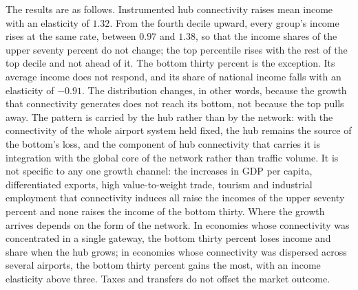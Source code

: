 The results are as follows. Instrumented hub connectivity raises mean income with an elasticity of $1.32$. From the fourth decile upward, every group's income rises at the same rate, between $0.97$ and $1.38$, so that the income shares of the upper seventy percent do not change; the top percentile rises with the rest of the top decile and not ahead of it. The bottom thirty percent is the exception. Its average income does not respond, and its share of national income falls with an elasticity of $-0.91$. The distribution changes, in other words, because the growth that connectivity generates does not reach its bottom, not because the top pulls away. The pattern is carried by the hub rather than by the network: with the connectivity of the whole airport system held fixed, the hub remains the source of the bottom's loss, and the component of hub connectivity that carries it is integration with the global core of the network rather than traffic volume. It is not specific to any one growth channel: the increases in GDP per capita, differentiated exports, high value-to-weight trade, tourism and industrial employment that connectivity induces all raise the incomes of the upper seventy percent and none raises the income of the bottom thirty. Where the growth arrives depends on the form of the network. In economies whose connectivity was concentrated in a single gateway, the bottom thirty percent loses income and share when the hub grows; in economies whose connectivity was dispersed across several airports, the bottom thirty percent gains the most, with an income elasticity above three. Taxes and transfers do not offset the market outcome.

